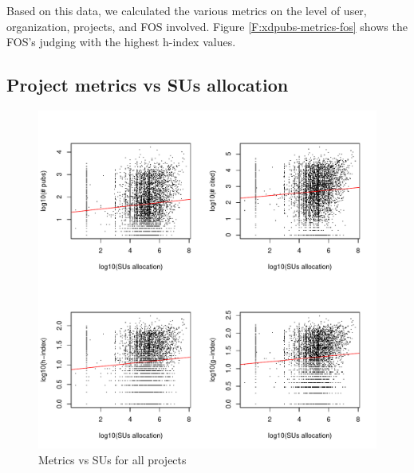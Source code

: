\documentclass{sig-alternate}
\begin{document}
Based on this data, we calculated the various metrics on the level of user, organization, projects, and FOS involved. Figure \ref{F:xdpubs-metrics-fos} shows the FOS’s judging with the highest h-index values. 
 
\subsection{Project metrics vs SUs allocation} 
 
\begin{figure}[htb] 
  \centering 
    \includegraphics[width=1.0\columnwidth]{images/02_metrics_vs_alloc_proj.pdf} 
  \caption{Metrics vs SUs for all projects}\label{F:metrics-vs-alloc-proj} 
\end{figure} 
 
\end{document}
